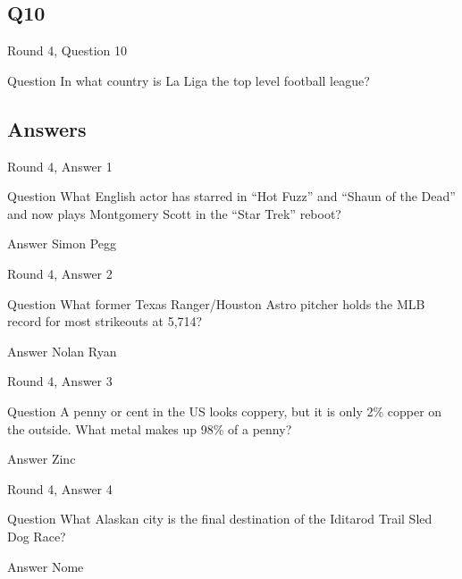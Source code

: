 \documentclass[11pt]{beamer}
\begin{document}
\subsection*{Q10}
\begin{frame}[t]{Round 4, Question 10}
\vspace{2em}
\begin{block}{Question}
In what country is La Liga the top level football league\@?
\end{block}
\end{frame}
    
\subsection{Answers}

\begin{frame}[t]{Round 4, Answer 1}
\vspace{2em}
\begin{block}{Question}
What English actor has starred in ``Hot Fuzz'' and ``Shaun of the Dead'' and now plays Montgomery Scott in the ``Star Trek'' reboot\@?
\end{block}
\pause{}
\begin{block}{Answer}
Simon Pegg
\end{block}
\end{frame}
    

\begin{frame}[t]{Round 4, Answer 2}
\vspace{2em}
\begin{block}{Question}
What former Texas Ranger/Houston Astro pitcher holds the MLB record for most strikeouts at 5,714\@?
\end{block}
\pause{}
\begin{block}{Answer}
Nolan Ryan
\end{block}
\end{frame}
    

\begin{frame}[t]{Round 4, Answer 3}
\vspace{2em}
\begin{block}{Question}
A penny or cent in the US looks coppery, but it is only 2\% copper on the outside. What metal makes up 98\% of a penny\@?
\end{block}
\pause{}
\begin{block}{Answer}
Zinc
\end{block}
\end{frame}
    

\begin{frame}[t]{Round 4, Answer 4}
\vspace{2em}
\begin{block}{Question}
What Alaskan city is the final destination of the Iditarod Trail Sled Dog Race\@?
\end{block}
\pause{}
\begin{block}{Answer}
Nome
\end{block}
\end{frame}
    
\end{document}
